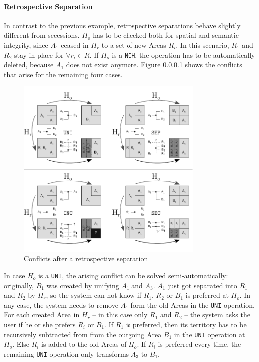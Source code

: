 \paragraph{Retrospective Separation} %
\label{par:retrospective_separation}

In contrast to the previous example, retrospective separations behave slightly different from secessions. $H_o$ has to be checked both for spatial and semantic integrity, since $A_1$ ceased in $H_r$ to a set of new Areas $R_i$. In this scenario, $R_1$ and $R_2$ stay in place for $\forall r_i \in R$. If $H_o$ is a \texttt{NCH}, the operation has to be automatically deleted, because $A_1$ does not exist anymore. Figure \ref{par:retrospective_separation} shows the conflicts that arise for the remaining four cases.

\begin{figure}[ht]
\vspace{1em}
  \centering
  \includegraphics[width=0.8\textwidth]{graphics/development/update_conflict/SEP}
  \caption{Conflicts after a retrospective separation}
  \label{fig:update_conflict_SEP}
\end{figure}

In case $H_o$ is a \texttt{UNI}, the arising conflict can be solved semi-automatically: originally, $B_1$ was created by unifying $A_1$ and $A_3$. $A_1$ just got separated into $R_1$ and $R_2$ by $H_r$, so the system can not know if $R_1$, $R_2$ or $B_1$ is preferred at $H_o$. In any case, the system needs to remove $A_1$ form the old Areas in the \texttt{UNI} operation. For each created Area in $H_r$ -- in this case only $R_1$ and $R_2$ -- the system asks the user if he or she prefers $R_i$ or $B_1$. If $R_1$ is preferred, then its territory has to be recursively subtracted from from the outgoing Area $B_1$ in the \texttt{UNI} operation at $H_o$. Else $R_i$ is added to the old Areas of $H_o$. If $R_i$ is preferred every time, the remaining \texttt{UNI} operation only transforms $A_3$ to $B_1$.

